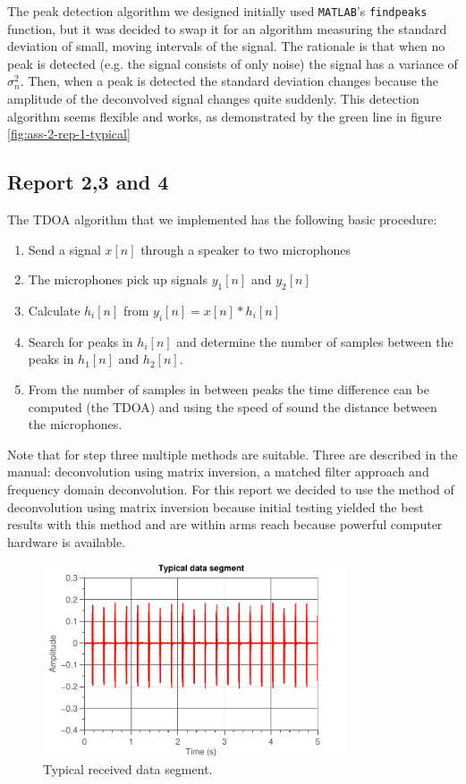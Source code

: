 \documentclass[11pt,titlepage]{report}
\begin{document}
The peak detection algorithm we designed initially used \texttt{MATLAB}'s \texttt{findpeaks} function, but it was decided to swap it for an algorithm measuring the standard deviation of small, moving intervals of the signal. The rationale is that when no peak is detected (e.g. the signal consists of only noise) the signal has a variance of $\sigma_n^2$. Then, when a peak is detected the standard deviation changes because the amplitude of the deconvolved signal changes quite suddenly. This detection algorithm seems flexible and works, as demonstrated by the green line in figure \ref{fig:ass-2-rep-1-typical}

\subsection{Report 2,3 and 4}
The TDOA algorithm that we implemented has the following basic procedure: 
\begin{enumerate}
\item Send a signal $x[n]$ through a speaker to two microphones
\item The microphones pick up signals $y_1[n]$ and $y_2[n]$
\item Calculate $h_i[n]$ from $y_i[n]=x[n]*h_i[n]$ 
\item Search for peaks in $h_i[n]$ and determine the number of samples between the peaks in $h_1[n]$ and $h_2[n]$.
\item From the number of samples in between peaks the time difference can be computed (the TDOA) and using the speed of sound the distance between the microphones.
\end{enumerate}
Note that for step three multiple methods are suitable. Three are described in the manual: deconvolution using matrix inversion, a matched filter approach and frequency domain deconvolution. For this report we decided to use the method of deconvolution using matrix inversion because initial testing yielded the best results with this method and are within arms reach because powerful computer hardware is available. %
\begin{figure}[H]
	\centering
	\includegraphics[width=0.8\textwidth]{../../deliverable-7-resources/figures/ass-2/report-2-3/ass-2-report-2-typical-data-segment.pdf}
	\caption{Typical received data segment.}
	\label{fig:ass-2-rep-2-data-segment}
\end{figure}
\end{document}
